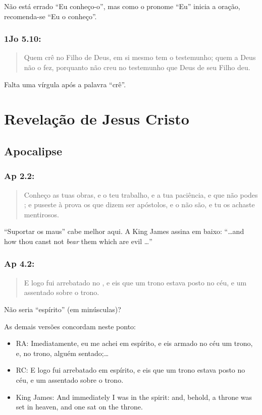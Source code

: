 Não está errado ``Eu conheço-o'', mas como o pronome ``Eu'' inicia a oração, recomenda-se ``Eu o conheço''.

\subsection{1Jo 5.10:}
\begin{quote}
    \small
Quem crê no Filho de Deus, em si mesmo tem o
testemunho; quem a Deus não  o fez, porquanto não creu no testemunho que Deus de seu Filho deu.
\end{quote}

Falta uma vírgula após a palavra ``crê''.

\chapter{Revelação de Jesus Cristo}
\section{Apocalipse}
\subsection{Ap 2.2:}
\begin{quote}
    \small
Conheço as tuas obras, e o teu trabalho, e a tua
 paciência, e que não podes ; e puseste à prova
 os que dizem ser apóstolos, e o não são, e tu os achaste
 mentirosos.
\end{quote}

``Suportar os maus'' cabe melhor aqui. A King James assina em baixo: ``\ldots{}and how thou canst not \emph{bear} them which are evil \ldots''

\subsection{Ap 4.2:}
\begin{quote}
    \small
E logo fui arrebatado no , e eis que um trono estava posto no céu, e um assentado sobre o trono.
\end{quote}

Não seria ``espírito'' (em minúsculas)?

As demais versões concordam neste ponto:
\begin{itemize}
\item RA: Imediatamente, eu me achei em espírito, e eis armado no céu um
trono, e, no trono, alguém sentado;\ldots
\item RC: E logo fui arrebatado em espírito, e eis que um trono estava
posto no céu, e um assentado sobre o trono.
\item King James: And immediately I was in the spirit: and, behold, a throne was set in heaven, and one sat on the throne.
\end{itemize}

